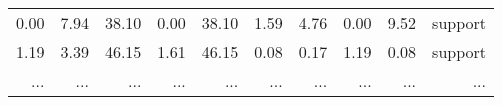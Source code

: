 \begin{table}[]
\begin{tabular}{@{}rrrrrrrrrc@{}}
      0.00                                                                            & 7.94                                                                                   & 38.10                                                                          & 0.00                                                                                     & 38.10                                                                                    & 1.59                                                                            & 4.76                                                                                     & 0.00                                                                           & 9.52                                                                             & support                                                       \\
      1.19                                                                            & 3.39                                                                                   & 46.15                                                                          & 1.61                                                                                     & 46.15                                                                                    & 0.08                                                                            & 0.17                                                                                     & 1.19                                                                           & 0.08                                                                             & support                                                       \\
      ...                                                                             & ...                                                                                    & ...                                                                            & ...                                                                                      & ...                                                                                      & ...                                                                             & ...                                                                                      & ...                                                                            & ...                                                                              & \multicolumn{1}{r}{...}                                       \\ \bottomrule
   \end{tabular}
\end{table}